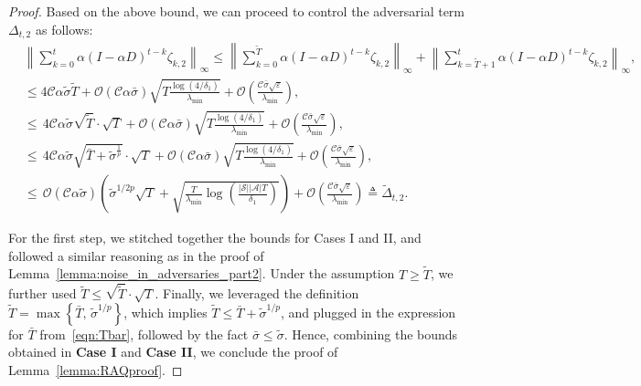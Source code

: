 \documentclass{article}
\newcommand{\mc}{\mathcal}
\begin{document}
\begin{proof}
Based on the above bound, we can proceed to 
control the adversarial term \(\Delta_{t,2}\) as follows: 
\begin{equation}\label{eqn:delta_2_raq}
\begin{aligned}
    &\left\lVert \sum_{k=0}^{t} \alpha (I-\alpha D)^{t-k} \mathcal{\zeta}_{k,2}\right\rVert_\infty \le \left\lVert \sum_{k=0}^{\tilde{T}} \alpha (I-\alpha D)^{t-k} \mathcal{\zeta}_{k,2}\right\rVert_\infty + \left\lVert \sum_{k=\tilde{T}+1}^{t} \alpha (I-\alpha D)^{t-k} \mathcal{\zeta}_{k,2}\right\rVert_\infty,\\
    &\overset{}{\le} 4 \mc{C} \alpha \tilde{\sigma} \tilde{T} 
+ \mathcal{O} (\mc{C} \alpha \bar{\sigma}) \sqrt{ T\frac{ \log(4/\delta_1)}{\lambda_{\min}}} 
+ \mathcal{O} \left( \frac{\mc{C} \bar{\sigma} \sqrt{\varepsilon}}{\lambda_{\min}} \right),\\
&{\le} \, 4\mc{C}\alpha \tilde{\sigma} \sqrt{\tilde{T}}\cdot\sqrt{T} 
+ \mathcal{O} (\mc{C} \alpha \bar{\sigma}) \sqrt{ T\frac{ \log(4/\delta_1)}{\lambda_{\min}}} 
+ \mathcal{O} \left( \frac{\mc{C} \bar{\sigma} \sqrt{\varepsilon}}{\lambda_{\min}} \right),\\
&{\le} \, 4\mc{C}\alpha \tilde{\sigma} \sqrt{\bar{T} + \tilde{\sigma}^{\frac{1}{p}}}\cdot\sqrt{T} 
+ \mathcal{O} (\mc{C} \alpha \bar{\sigma}) \sqrt{ T\frac{ \log(4/\delta_1)}{\lambda_{\min}}} 
+ \mathcal{O} \left( \frac{\mc{C}  \bar{\sigma} \sqrt{\varepsilon}}{\lambda_{\min}} \right),\\
&{\le} \, \mathcal{O}(\mc{C} \alpha \tilde{\sigma}) \left( 
    \tilde{\sigma}^{1/2p} \sqrt{T} 
    + \sqrt{ \frac{T}{\lambda_{\min}} \log\left( \frac{|\mathcal{S}||\mathcal{A}|T}{\delta_1} \right) }
\right) 
+ \mathcal{O}\left( \frac{\mc{C} \bar{\sigma} \sqrt{\varepsilon} }{ \lambda_{\min} } \right) \triangleq \tilde{\Delta}_{t,2}.
    \end{aligned}
\end{equation}

For the first step, we stitched together the bounds for Cases I and II, and followed a similar reasoning as in the proof of Lemma~\ref{lemma:noise_in_adversaries_part2}. Under the assumption \(T \geq \tilde{T}\), we further used \({\tilde{T}} \leq \sqrt{\tilde{T}} \cdot \sqrt{{T}}\). Finally, we leveraged the definition \(\tilde{T} = \max\left\{ \bar{T},\, \tilde{\sigma}^{1/p} \right\}\), which implies \(\tilde{T} \leq \bar{T} + \tilde{\sigma}^{1/p}\), and plugged in the expression for $\bar{T}$ from~\eqref{eqn:Tbar}, followed by the fact \(\bar{\sigma} \le \tilde{\sigma}\).  Hence, combining the bounds obtained in \textbf{Case I} and \textbf{Case II}, we conclude the proof of Lemma~\ref{lemma:RAQproof}.
\end{proof}
\end{document}
